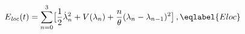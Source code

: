 \begin{equation}
E_{\it loc}(t) = \sum_{n=0}^3 \bigl[\frac 12\dot\lambda_n^2 + 
V(\lambda_n)+ \frac n\theta(\lambda_n-\lambda_{n-1})^2\bigr] \,,
\eqlabel{Eloc}
\end{equation}

